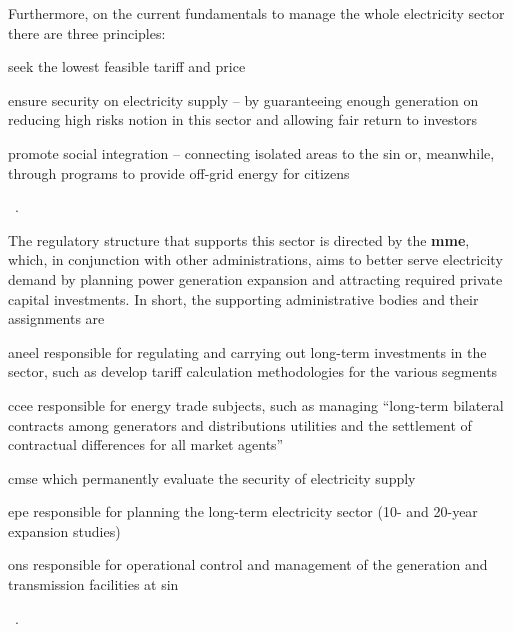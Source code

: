 Furthermore, on the current fundamentals to manage the whole electricity sector there are three principles:
\begin{enumerate*}[label={{(\roman*)}},itemjoin={{; }},itemjoin*={{; and }}]
	\item seek the lowest feasible tariff and price
    \item ensure security on electricity supply -- by guaranteeing enough generation on reducing high risks notion in this sector and allowing fair return to investors
    \item promote social integration -- connecting isolated areas to the \gls{sin} or, meanwhile, through programs to provide off-grid energy for citizens
\end{enumerate*}%
~\cite{modeloBR,lud2007}.

The regulatory structure that supports this sector is directed by the \textbf{\gls{mme}}, which, in conjunction with other administrations, aims to better serve electricity demand by planning power generation expansion and attracting required private capital investments.
In short, the supporting administrative bodies and their assignments are
\begin{descriptive}
	\item[\gls{aneel}] responsible for regulating and carrying out long-term investments in the sector, such as develop tariff calculation methodologies for the various segments%
    \item[\gls{ccee}] responsible for energy trade subjects, such as managing ``long-term bilateral contracts among generators and distributions utilities and the settlement of contractual differences for all market agents''
    \item[\gls{cmse}] which permanently evaluate the security of electricity supply
    \item[\gls{epe}] responsible for planning the long-term electricity sector (10- and 20-year expansion studies)
    \item[\gls{ons}] responsible for operational control and management of the generation and transmission facilities at \gls{sin}
\end{descriptive}%
~\cite{modeloBR,tarifas,lud2007}.

